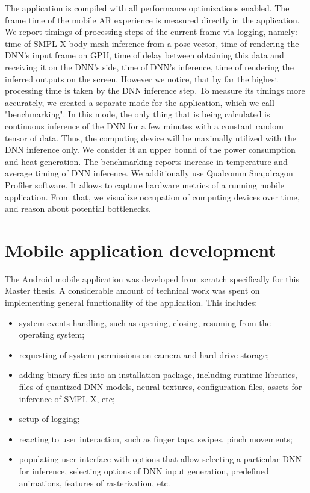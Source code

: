 The application is compiled with all performance optimizations enabled. The frame time of the mobile AR experience is measured directly in the application. We report timings of processing steps of the current frame via logging, namely: time of SMPL-X body mesh inference from a pose vector, time of rendering the DNN's input frame on GPU, time of delay between obtaining this data and receiving it on the DNN's side, time of DNN's inference, time of rendering the inferred outputs on the screen. However we notice, that by far the highest processing time is taken by the DNN inference step. To measure its timings more accurately, we created a separate mode for the application, which we call "benchmarking". In this mode, the only thing that is being calculated is continuous inference of the DNN for a few minutes with a constant random tensor of data. Thus, the computing device will be maximally utilized with the DNN inference only. We consider it an upper bound of the power consumption and heat generation. The benchmarking reports increase in temperature and average timing of DNN inference. We additionally use Qualcomm Snapdragon Profiler software. It allows to capture hardware metrics of a running mobile application. From that, we visualize occupation of computing devices over time, and reason about potential bottlenecks.

\section{Mobile application development}
\label{methods:app}

The Android mobile application was developed from scratch specifically for this Master thesis. A considerable amount of technical work was spent on implementing general functionality of the application. This includes:
\begin{itemize}
	\item system events handling, such as opening, closing, resuming from the operating system;
	\item requesting of system permissions on camera and hard drive storage;
	\item adding binary files into an installation package, including runtime libraries, files of quantized DNN models, neural textures, configuration files, assets for inference of SMPL-X, etc;
	\item setup of logging;
	\item reacting to user interaction, such as finger taps, swipes, pinch movements;
	\item populating user interface with options that allow selecting a particular DNN for inference, selecting options of DNN input generation, predefined animations, features of rasterization, etc. 
\end{itemize}


